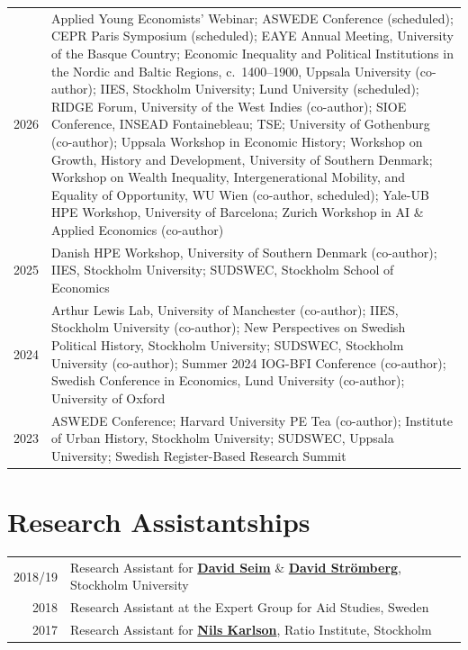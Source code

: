 \documentclass[a4paper]{article}
\makeatletter
\newenvironment{cvtabular}
  {\begin{tabular}{@{}D@{\hspace{6pt}}Y@{}}}
  {\end{tabular}}
\newenvironment{cvlongtable}
  {\begin{longtable}{@{}D@{\hspace{6pt}}Y@{}}}
  {\end{longtable}}
\makeatother
\begin{document}
\begin{cvlongtable}
2026 & Applied Young Economists' Webinar; ASWEDE Conference (scheduled); CEPR Paris Symposium (scheduled); EAYE Annual Meeting, University of the Basque Country; Economic Inequality and Political Institutions in the Nordic and Baltic Regions, c.~1400--1900, Uppsala University (co-author); IIES, Stockholm University; Lund University (scheduled); RIDGE Forum, University of the West Indies (co-author); SIOE Conference, INSEAD Fontainebleau; TSE; University of Gothenburg (co-author); Uppsala Workshop in Economic History; Workshop on Growth, History and Development, University of Southern Denmark; Workshop on Wealth Inequality, Intergenerational Mobility, and Equality of Opportunity, WU Wien (co-author, scheduled); Yale-UB HPE Workshop, University of Barcelona; Zurich Workshop in AI \& Applied Economics (co-author) \\
2025 & Danish HPE Workshop, University of Southern Denmark (co-author); IIES, Stockholm University; SUDSWEC, Stockholm School of Economics \\
2024 & Arthur Lewis Lab, University of Manchester (co-author); IIES, Stockholm University (co-author); New Perspectives on Swedish Political History, Stockholm University; SUDSWEC, Stockholm University (co-author); Summer 2024 IOG-BFI Conference (co-author); Swedish Conference in Economics, Lund University (co-author); University of Oxford \\
2023 & ASWEDE Conference; Harvard University PE Tea (co-author); Institute of Urban History, Stockholm University; SUDSWEC, Uppsala University; Swedish Register-Based Research Summit
\end{cvlongtable}

\section*{Research Assistantships}

\begin{cvtabular}
2018/19 & Research Assistant for \href{https://www.davidseim.com/}{\textbf{David Seim}} \& \href{https://www.su.se/english/profiles/d/dstro}{\textbf{David Str\"{o}mberg}}, Stockholm University \\
2018 & Research Assistant at the Expert Group for Aid Studies, Sweden \\
2017 & Research Assistant for \href{https://ratio.se/en/employees/nils-karlson}{\textbf{Nils Karlson}}, Ratio Institute, Stockholm
\end{cvtabular}
\end{document}
